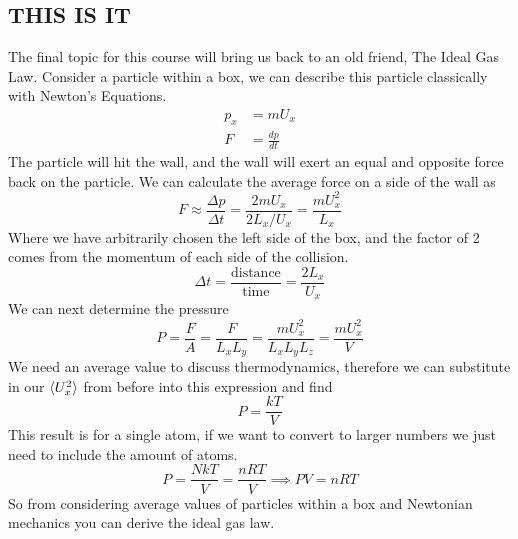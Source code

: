\documentclass{article}
\begin{document}
\subsection*{THIS IS IT}
The final topic for this course will bring us back to an old friend, The Ideal Gas Law. 
Consider a particle within a box, we can describe this particle classically with Newton's Equations. 
\begin{equation}
\begin{split}
    p_x &= mU_x \\
    F &= \frac{dp}{dt}
\end{split}
\end{equation}
The particle will hit the wall, and the wall will exert an equal and opposite force back on the particle. 
We can calculate the average force on a side of the wall as 
\begin{equation}
F \approx \frac{\Delta p}{\Delta t} = \frac{2mU_x}{2L_x/U_x} = \frac{mU_x^2}{L_x}
\end{equation}
Where we have arbitrarily chosen the left side of the box, and the factor of 2 comes from the momentum of each side of the collision. 
\begin{equation}
\Delta t = \frac{\text{distance}}{\text{time}} = \frac{2L_x}{U_x}
\end{equation}
We can next determine the pressure
\begin{equation}
P = \frac{F}{A} = \frac{F}{L_xL_y} = \frac{mU_x^2}{L_xL_yL_z} = \frac{mU_x^2}{V}
\end{equation}
We need an average value to discuss thermodynamics, therefore we can substitute in our $\braket{U_x^2}$ from before into this expression and find
\begin{equation}
P = \frac{kT}{V}
\end{equation}
This result is for a single atom, if we want to convert to larger numbers we just need to include the amount of atoms. 
\begin{equation}
P = \frac{NkT}{V} = \frac{nRT}{V} \implies PV = nRT
\end{equation}
So from considering average values of particles within a box and Newtonian mechanics you can derive the ideal gas law. 
\end{document}
